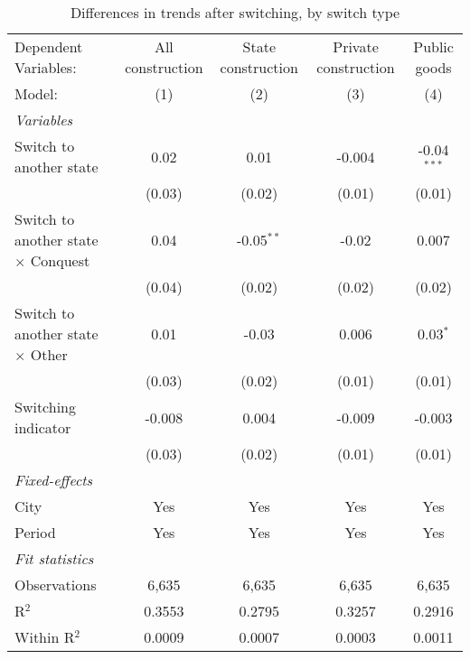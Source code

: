 \begin{table}[htbp]
   \caption{\label{tab:baseline_50y} Differences in trends after switching, by switch type}
   \centering
   \begin{tabular}{lcccc}
      \tabularnewline \midrule \midrule
      Dependent Variables:                       & All construction & State construction & Private construction & Public goods\\  
      Model:                                     & (1)              & (2)                & (3)                  & (4)\\  
      \midrule
      \emph{Variables}\\
      Switch to another state                    & 0.02             & 0.01               & -0.004               & -0.04$^{***}$\\   
                                                 & (0.03)           & (0.02)             & (0.01)               & (0.01)\\   
      Switch to another state $\times$ Conquest  & 0.04             & -0.05$^{**}$       & -0.02                & 0.007\\   
                                                 & (0.04)           & (0.02)             & (0.02)               & (0.02)\\   
      Switch to another state $\times$ Other     & 0.01             & -0.03              & 0.006                & 0.03$^{*}$\\   
                                                 & (0.03)           & (0.02)             & (0.01)               & (0.01)\\   
      Switching indicator                        & -0.008           & 0.004              & -0.009               & -0.003\\   
                                                 & (0.03)           & (0.02)             & (0.01)               & (0.01)\\   
      \midrule
      \emph{Fixed-effects}\\
      City                                       & Yes              & Yes                & Yes                  & Yes\\  
      Period                                     & Yes              & Yes                & Yes                  & Yes\\  
      \midrule
      \emph{Fit statistics}\\
      Observations                               & 6,635            & 6,635              & 6,635                & 6,635\\  
      R$^2$                                      & 0.3553           & 0.2795             & 0.3257               & 0.2916\\  
      Within R$^2$                               & 0.0009           & 0.0007             & 0.0003               & 0.0011\\  
      \midrule \midrule
      

\end{tabular}
\end{table}

